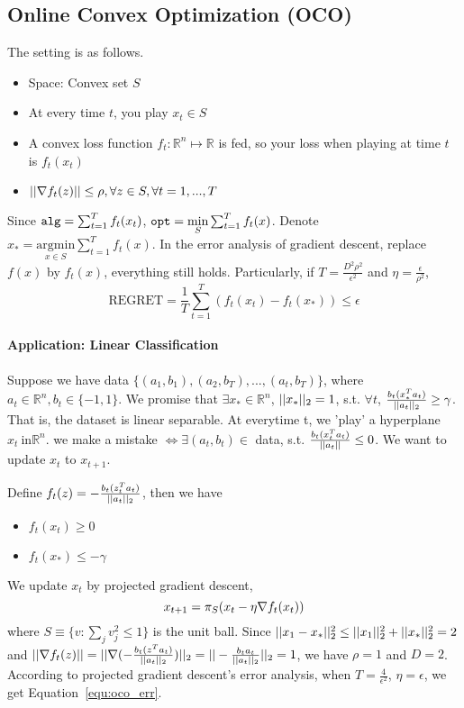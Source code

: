 \documentclass[11pt]{article}
\begin{document}
\subsection{Online Convex Optimization (OCO)}
The setting is as follows.
\begin{itemize}
    \item Space: Convex set $S$
    \item At every time $t$, you play $x_t \in S$
    \item A convex loss function $f_t: \mathbb{R}^n \mapsto \mathbb{R}$ is fed, so your loss when playing at time $t$ is $f_t(x_t)$
    \item $||\nabla f_t(z)|| \leq \rho, \forall z \in S, \forall t = 1,...,T $
\end{itemize}
Since ${\tt alg} = \sum_{t=1}^T f_t(x_t)$, ${\tt opt} = \underset{S}{\text{min}} \sum_{t=1}^T f_t(x)$. Denote $x_* = \underset{x \in S}{\text{argmin}}\sum_{t=1}^T f_t(x)$. In the error analysis of gradient descent, replace $f(x)$ by $f_t(x)$, everything still holds. Particularly, if $T=\frac{D^2\rho^2}{\epsilon^2}$ and $\eta=\frac{\epsilon}{\rho^2}$,
\begin{equation}
    \text{REGRET} = \frac{1}{T}\sum_{t=1}^T(f_t(x_t)-f_t(x_*)) \leq \epsilon
    \label{equ:oco_err}
\end{equation}
\paragraph{Application: Linear Classification}
Suppose we have data $\{(a_1, b_1), (a_2,b_T),...,(a_t,b_T)\}$, where $a_t \in \mathbb{R}^n, b_t \in \{-1,1\}$. We promise that $\exists  x_* \in \mathbb{R}^n$, $||x_*||_2=1$, s.t. $\forall t$, $\frac{b_t(x_*^Ta_t)}{||a_t||_2} \geq \gamma$. That is, the dataset is linear separable.
At everytime t, we 'play' a hyperplane $x_t \ \text{in} \mathbb{R}^n$. we make a mistake $\iff \exists (a_t,b_t) \in$ data, s.t. $\frac{b_t(x_t^Ta_t)}{||a_t||} \leq 0$. 
We want to update $x_t$ to $x_{t+1}$.

Define $f_t(z) = - \frac{b_t(z_t^T a_t)}{||a_t||_2}$, then we have
\begin{itemize}
    \item $f_t(x_t) \geq 0$
    \item $f_t(x_*) \leq -\gamma$
\end{itemize}
We update $x_t$ by projected gradient descent,
\begin{equation}
    x_{t+1} = \pi_S(x_t - \eta \nabla f_t(x_t)) \notag
\end{equation}
where $S \equiv \{v: \sum_j v_j^2 \leq 1\}$ is the unit ball. Since $||x_1 - x_*||_2^2 \leq ||x_1||_2^2 + ||x_*||_2^2 = 2$ and $||\nabla f_t(z)|| = ||\nabla(-\frac{b_t(z^T a_t)}{|| a_t||_2})||_2 = ||-\frac{b_t a_t}{||a_t||_2}||_2 = 1$, we have $\rho = 1$ and $D=2$. According to projected gradient descent's error analysis, when $T=\frac{4}{\epsilon^2}$, $\eta=\epsilon$, we get Equation~\ref{equ:oco_err}.
\end{document}
